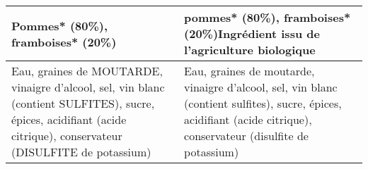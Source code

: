\begin{longtable}{p{7cm}p{7cm}}
                                                                                                                                                                                                                                                                                                                                                                                                                                                                                                                                                                                                                                                                                                                                                                                Pommes* (80\%), framboises* (20\%) &                                                                                                                                                                                                                                                                                                                                                                                                                                                                                                                                                                                                                                                                                                                             pommes* (80\%), framboises* (20\%)\newline *Ingrédient issu de l'agriculture biologique \\ \hline
                                                                                                                                                                                                                                                                                                                                                                                                                                                                                                                                                                                                                                              Eau, graines de MOUTARDE, vinaigre d'alcool, sel, vin blanc (contient SULFITES), sucre, épices, acidifiant (acide citrique), conservateur (DISULFITE de potassium) &                                                                                                                                                                                                                                                                                                                                                                                                                                                                                                                                                                                                                                         Eau, graines de moutarde, vinaigre d'alcool, sel, vin blanc (contient sulfites), sucre, épices, acidifiant (acide citrique), conservateur (disulfite de potassium) \\ \hline

\end{longtable}
